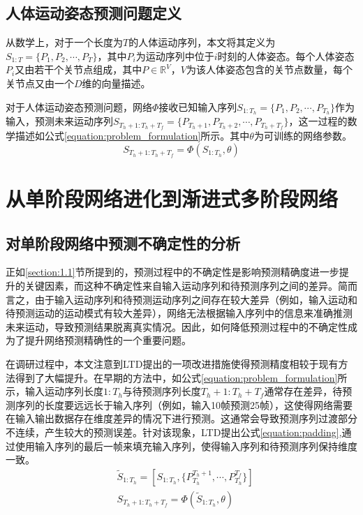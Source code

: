 \subsection{人体运动姿态预测问题定义}
从数学上，对于一个长度为$T$的人体运动序列，本文将其定义为$S_{1:T} = \{P_1,P_2,\cdots,P_{T}\}$，其中$P_i$为运动序列中位于$i$时刻的人体姿态。每个人体姿态$P_i$又由若干个关节点组成，其中$P \in \mathbb{R}^V$，$V$为该人体姿态包含的关节点数量，每个关节点又由一个$D$维的向量描述。

对于人体运动姿态预测问题，网络$\Phi$接收已知输入序列$S_{1:T_h} = \{P_1,P_2,\cdots,P_{T_h}\}$作为输入，预测未来运动序列$S_{T_h+1:T_h+T_f} = \{P_{T_h+1},P_{T_h+2},\cdots,P_{T_h+T_f}\}$，这一过程的数学描述如公式\ref{equation:problem_formulation}所示。其中$\theta$为可训练的网络参数。
\begin{equation}
    S_{T_h+1:T_h+T_f} = \Phi(S_{1:T_h}, \theta) \label{equation:problem_formulation}
\end{equation}

\section{从单阶段网络进化到渐进式多阶段网络}
\subsection{对单阶段网络中预测不确定性的分析}
正如\ref{section:1.1}节所提到的，预测过程中的不确定性是影响预测精确度进一步提升的关键因素，而这种不确定性来自输入运动序列和待预测序列之间的差异。简而言之，由于输入运动序列和待预测运动序列之间存在较大差异（例如，输入运动和待预测运动的运动模式有较大差异），网络无法根据输入序列中的信息来准确推测未来运动，导致预测结果脱离真实情况。因此，如何降低预测过程中的不确定性成为了提升网络预测精确性的一个重要问题。

在调研过程中，本文注意到LTD\parencite{mao2019learning}提出的一项改进措施使得预测精度相较于现有方法得到了大幅提升。在早期的方法中，如公式\ref{equation:problem_formulation}所示，输入运动序列长度$1:T_h$与待预测序列长度$T_h+1:T_h+T_f$通常存在差异，待预测序列的长度要远远长于输入序列（例如，输入10帧预测25帧），这使得网络需要在输入输出数据存在维度差异的情况下进行预测。这通常会导致预测序列过渡部分不连续，产生较大的预测误差。针对该现象，LTD\parencite{mao2019learning}提出公式\ref{equation:padding},通过使用输入序列的最后一帧来填充输入序列，使得输入序列和待预测序列保持维度一致。
\begin{equation}
    \begin{aligned}
        &\widetilde{S}_{1:T_h} = [S_{1:T_h}, \{P^{T_h+1}_{T_h}, \cdots, P^{T_f}_{T_h} \} ]
        \\
        &S_{T_h+1:T_h+T_f} = \Phi(\widetilde{S}_{1:T_h}, \theta)
    \end{aligned}
    \label{equation:padding}
\end{equation}

